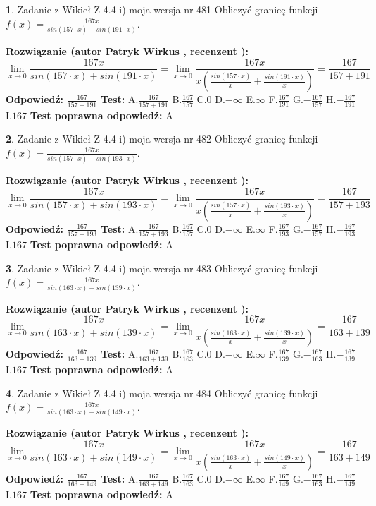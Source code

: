 \documentclass[12pt, a4paper]{article}
\theoremstyle{definition} %
\newtheorem{zad}{}
\newcommand{\zadStart}[1]{\begin{zad}#1\newline}
\newcommand{\zadStop}{\end{zad}}
\newcommand{\rozwStart}[2]{\noindent \textbf{Rozwiązanie (autor #1 , recenzent #2): }\newline}
\newcommand{\rozwStop}{\newline}
\newcommand{\odpStart}{\noindent \textbf{Odpowiedź:}\newline}
\newcommand{\odpStop}{\newline}
\newcommand{\testStart}{\noindent \textbf{Test:}\newline}
\newcommand{\testStop}{\newline}
\newcommand{\kluczStart}{\noindent \textbf{Test poprawna odpowiedź:}\newline}
\newcommand{\kluczStop}{\newline}
\begin{document}
\zadStart{Zadanie z Wikieł Z 4.4 i) moja wersja nr 481}
Obliczyć granicę funkcji $f(x)=\frac{167x}{sin(157\cdot x) +sin(191\cdot x)}$.
\zadStop
\rozwStart{Patryk Wirkus}{}
$$\lim\limits_{x\to 0}\frac{167x}{sin(157\cdot x) +sin(191\cdot x)}=\lim\limits_{x\to 0}\frac{167x}{x(\frac{sin(157\cdot x)}{x}+\frac{sin(191\cdot x)}{x})}=\frac{167}{157+191}$$
\rozwStop
\odpStart
$\frac{167}{157+191}$
\odpStop
\testStart
A.$\frac{167}{157+191}$
B.$\frac{167}{157}$
C.$0$
D.$-\infty$
E.$\infty$
F.$\frac{167}{191}$
G.$-\frac{167}{157}$
H.$-\frac{167}{191}$
I.$167$
\testStop
\kluczStart
A
\kluczStop



\zadStart{Zadanie z Wikieł Z 4.4 i) moja wersja nr 482}
Obliczyć granicę funkcji $f(x)=\frac{167x}{sin(157\cdot x) +sin(193\cdot x)}$.
\zadStop
\rozwStart{Patryk Wirkus}{}
$$\lim\limits_{x\to 0}\frac{167x}{sin(157\cdot x) +sin(193\cdot x)}=\lim\limits_{x\to 0}\frac{167x}{x(\frac{sin(157\cdot x)}{x}+\frac{sin(193\cdot x)}{x})}=\frac{167}{157+193}$$
\rozwStop
\odpStart
$\frac{167}{157+193}$
\odpStop
\testStart
A.$\frac{167}{157+193}$
B.$\frac{167}{157}$
C.$0$
D.$-\infty$
E.$\infty$
F.$\frac{167}{193}$
G.$-\frac{167}{157}$
H.$-\frac{167}{193}$
I.$167$
\testStop
\kluczStart
A
\kluczStop



\zadStart{Zadanie z Wikieł Z 4.4 i) moja wersja nr 483}
Obliczyć granicę funkcji $f(x)=\frac{167x}{sin(163\cdot x) +sin(139\cdot x)}$.
\zadStop
\rozwStart{Patryk Wirkus}{}
$$\lim\limits_{x\to 0}\frac{167x}{sin(163\cdot x) +sin(139\cdot x)}=\lim\limits_{x\to 0}\frac{167x}{x(\frac{sin(163\cdot x)}{x}+\frac{sin(139\cdot x)}{x})}=\frac{167}{163+139}$$
\rozwStop
\odpStart
$\frac{167}{163+139}$
\odpStop
\testStart
A.$\frac{167}{163+139}$
B.$\frac{167}{163}$
C.$0$
D.$-\infty$
E.$\infty$
F.$\frac{167}{139}$
G.$-\frac{167}{163}$
H.$-\frac{167}{139}$
I.$167$
\testStop
\kluczStart
A
\kluczStop



\zadStart{Zadanie z Wikieł Z 4.4 i) moja wersja nr 484}
Obliczyć granicę funkcji $f(x)=\frac{167x}{sin(163\cdot x) +sin(149\cdot x)}$.
\zadStop
\rozwStart{Patryk Wirkus}{}
$$\lim\limits_{x\to 0}\frac{167x}{sin(163\cdot x) +sin(149\cdot x)}=\lim\limits_{x\to 0}\frac{167x}{x(\frac{sin(163\cdot x)}{x}+\frac{sin(149\cdot x)}{x})}=\frac{167}{163+149}$$
\rozwStop
\odpStart
$\frac{167}{163+149}$
\odpStop
\testStart
A.$\frac{167}{163+149}$
B.$\frac{167}{163}$
C.$0$
D.$-\infty$
E.$\infty$
F.$\frac{167}{149}$
G.$-\frac{167}{163}$
H.$-\frac{167}{149}$
I.$167$
\testStop
\kluczStart
A
\kluczStop
\end{document}
